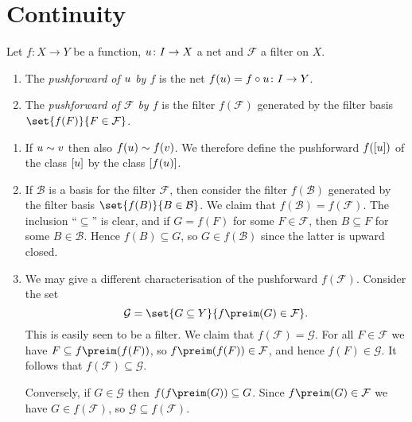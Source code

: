 \documentclass[article, a4paper, 11pt, oneside]{memoir}
\numberwithin{equation}{chapter}
\newcommand{\calB}{\mathcal{B}}
\newcommand{\calF}{\mathcal{F}}
\newcommand{\calG}{\mathcal{G}}
\theoremstyle{nonumberplain}
\begin{document}
\chapter{Continuity}

\begin{definition}
    Let $f \colon X \to Y$ be a function, $u \colon I \to X$ a net and $\calF$ a filter on $X$.
    \begin{enumerate}
        \item The \emph{pushforward of $u$ by $f$} is the net $f(u) = f \circ u \colon I \to Y$.
        \item The \emph{pushforward of $\calF$ by $f$} is the filter $f(\calF)$ generated by the filter basis $\set{f(F)}{F \in \calF}$.
    \end{enumerate}
\end{definition}

\begin{remarkbreak}
    \begin{enumerate}
        \item If $u \sim v$ then also $f(u) \sim f(v)$. We therefore define the pushforward $f([u])$ of the class $[u]$ by the class $[f(u)]$.
        
        \item If $\calB$ is a basis for the filter $\calF$, then consider the filter $f(\calB)$ generated by the filter basis $\set{f(B)}{B \in \calB}$. We claim that $f(\calB) = f(\calF)$. The inclusion \enquote{$\subseteq$} is clear, and if $G = f(F)$ for some $F \in \calF$, then $B \subseteq F$ for some $B \in \calB$. Hence $f(B) \subseteq G$, so $G \in f(\calB)$ since the latter is upward closed.
        
        \item We may give a different characterisation of the pushforward $f(\calF)$. Consider the set
        \begin{equation*}
            \calG
                = \set{G \subseteq Y}{f\preim(G) \in \calF}.
        \end{equation*}
        This is easily seen to be a filter. We claim that $f(\calF) = \calG$. For all $F \in \calF$ we have $F \subseteq f\preim(f(F))$, so $f\preim(f(F)) \in \calF$, and hence $f(F) \in \calG$. It follows that $f(\calF) \subseteq \calG$.

        Conversely, if $G \in \calG$ then $f(f\preim(G)) \subseteq G$. Since $f\preim(G) \in \calF$ we have $G \in f(\calF)$, so $\calG \subseteq f(\calF)$.
    \end{enumerate}
\end{remarkbreak}
\end{document}

